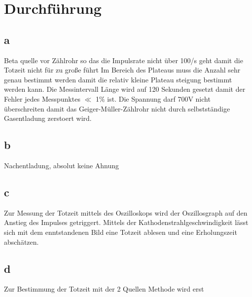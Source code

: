 \newpage
\section{Durchführung}

\subsection{a}
Beta quelle vor Zählrohr so das die Impulsrate nicht über 100/s geht damit die Totzeit nicht für zu große führt
Im Bereich des Plateaus muss die Anzahl sehr genau bestimmt werden damit die relativ kleine Plateau steigung bestimmt werden kann.
Die Messintervall Länge wird auf 120 Sekunden gesetzt damit der Fehler jedes Messpunktes $\ll$ 1$\percent$ ist.
Die Spannung darf 700V nicht überschreiten damit das Geiger-Müller-Zählrohr nicht durch selbstständige Gasentladung zerstoert wird.

\subsection{b}

Nachentladung, 
absolut keine Ahnung

\subsection{c}

Zur Messung der Totzeit mittels des Oszilloskops wird der Oszillosgraph auf den Anstieg des Impulses getriggert.
Mittels der Kathodenstrahlgeschwindigkeit lässt sich mit dem enntstandenen Bild eine Totzeit ablesen und eine Erholungszeit abschätzen.

\subsection{d}

Zur Bestimmung der Totzeit mit der 2 Quellen Methode wird erst 